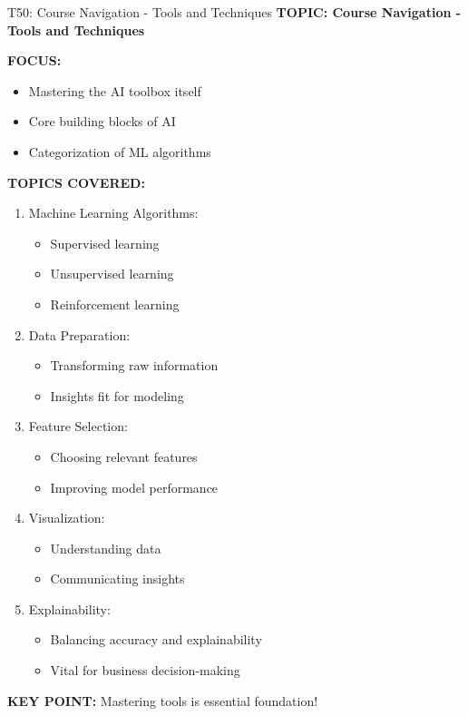 \documentclass[8pt]{beamer}
\begin{document}
	\begin{frame}{T50: Course Navigation - Tools and Techniques}
		\fontsize{6.5}{7.5}\selectfont
		\textbf{TOPIC: Course Navigation - Tools and Techniques}
		
		\vspace{0.1cm}
		\textbf{FOCUS:}
		\begin{itemize}
			\item Mastering the AI toolbox itself
			\item Core building blocks of AI
			\item Categorization of ML algorithms
		\end{itemize}
		
		\vspace{0.1cm}
		\textbf{TOPICS COVERED:}
		\begin{enumerate}
			\item \textcolor{myblue}{Machine Learning Algorithms:}
			\begin{itemize}
				\item Supervised learning
				\item Unsupervised learning
				\item Reinforcement learning
			\end{itemize}
			\item \textcolor{myblue}{Data Preparation:}
			\begin{itemize}
				\item Transforming raw information
				\item Insights fit for modeling
			\end{itemize}
			\item \textcolor{myblue}{Feature Selection:}
			\begin{itemize}
				\item Choosing relevant features
				\item Improving model performance
			\end{itemize}
			\item \textcolor{myblue}{Visualization:}
			\begin{itemize}
				\item Understanding data
				\item Communicating insights
			\end{itemize}
			\item \textcolor{myblue}{Explainability:}
			\begin{itemize}
				\item Balancing accuracy and explainability
				\item Vital for business decision-making
			\end{itemize}
		\end{enumerate}
		
		\textcolor{myred}{\textbf{KEY POINT:}} Mastering tools is \textcolor{myblue}{essential foundation}!
	\end{frame}
	
\end{document}
